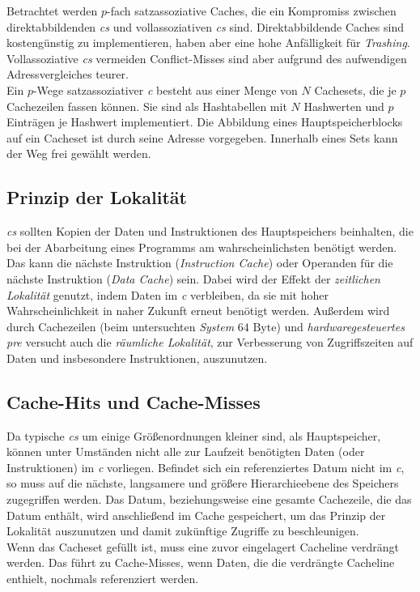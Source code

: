 \documentclass[]{scrbook}
\begin{document}
Betrachtet werden $p$-fach satzassoziative Caches, die ein Kompromiss zwischen direktabbildenden \textsl{\glspl{c}} und vollassoziativen \textsl{\glspl{c}} sind. Direktabbildende Caches sind kostengünstig zu implementieren, haben aber eine hohe Anfälligkeit für \textsl{Trashing}. Vollassoziative \textsl{\glspl{c}} vermeiden Conflict-Misses sind aber aufgrund des aufwendigen Adressvergleiches teurer.
\\
Ein $p$-Wege satzassoziativer \textsl{\gls{c}} besteht aus einer Menge von $N$ Cachesets, die je $p$ Cachezeilen fassen können.
Sie sind als Hashtabellen mit $N$ Hashwerten und $p$ Einträgen je Hashwert implementiert.
Die Abbildung eines Hauptspeicherblocks auf ein Cacheset ist durch seine Adresse vorgegeben.
Innerhalb eines Sets kann der Weg frei gewählt werden.


\subsection{Prinzip der Lokalität}

\textsl{\glspl{c}} sollten Kopien der Daten und Instruktionen des Hauptspeichers beinhalten, die bei der Abarbeitung eines Programms am wahrscheinlichsten benötigt werden.
Das kann die nächste Instruktion (\textsl{Instruction Cache}) oder Operanden für die nächste Instruktion (\textsl{Data Cache}) sein. 
Dabei wird der Effekt der \textsl{zeitlichen Lokalität} genutzt, indem Daten im \textsl{\gls{c}} verbleiben, da sie mit hoher Wahrscheinlichkeit in naher Zukunft erneut benötigt werden.
Außerdem wird durch Cachezeilen (beim untersuchten \textsl{\gls{System}} $64 \textrm{ Byte}$) und \textsl{hardwaregesteuertes \gls{pre}} versucht auch die \textsl{räumliche Lokalität}, zur Verbesserung von Zugriffszeiten auf Daten und insbesondere Instruktionen, auszunutzen.

\subsection{Cache-Hits und Cache-Misses}

Da typische \textsl{\glspl{c}} um einige Größenordnungen kleiner sind, als Hauptspeicher, können unter Umständen nicht alle zur Laufzeit benötigten Daten (oder Instruktionen) im \textsl{\gls{c}} vorliegen.
Befindet sich ein referenziertes Datum nicht im \textsl{\gls{c}}, so muss auf die nächste, langsamere und größere Hierarchieebene des Speichers zugegriffen werden.
Das Datum, beziehungsweise eine gesamte Cachezeile, die das Datum enthält, wird anschließend im Cache gespeichert, um das Prinzip der Lokalität auszunutzen und damit zukünftige Zugriffe zu beschleunigen.
\\
Wenn das Cacheset gefüllt ist, muss eine zuvor eingelagert Cacheline verdrängt werden.
Das führt zu Cache-Misses, wenn Daten, die die verdrängte Cacheline enthielt, nochmals referenziert werden.
\end{document}
